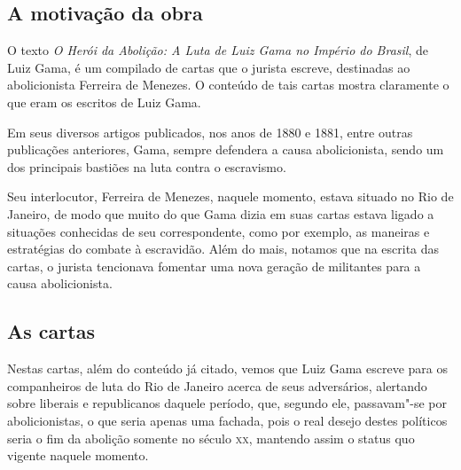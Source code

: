\documentclass[12pt]{extarticle}
\begin{document}


\subsection{A motivação da obra}

O texto \emph{O Herói da Abolição: A Luta de Luiz Gama no Império do
Brasil}, de Luiz Gama, é um compilado de cartas que o jurista escreve,
destinadas ao abolicionista Ferreira de Menezes. O conteúdo de tais
cartas mostra claramente o que eram os escritos de Luiz Gama.




Em seus diversos artigos publicados, nos anos de 1880 e 1881, entre
outras publicações anteriores, Gama, sempre defendera a causa
abolicionista, sendo um dos principais bastiões na luta contra o
escravismo.

Seu interlocutor, Ferreira de Menezes, naquele momento, estava situado
no Rio de Janeiro, de modo que muito do que Gama dizia em suas cartas
estava ligado a situações conhecidas de seu correspondente, como por
exemplo, as maneiras e estratégias do combate à escravidão. Além do
mais, notamos que na escrita das cartas, o jurista tencionava fomentar
uma nova geração de militantes para a causa abolicionista.

\subsection{As cartas}

Nestas cartas, além do conteúdo já citado, vemos que Luiz Gama escreve
para os companheiros de luta do Rio de Janeiro acerca de seus
adversários, alertando sobre liberais e republicanos daquele período,
que, segundo ele, passavam"-se por abolicionistas, o que seria apenas uma
fachada, pois o real desejo destes políticos seria o fim da abolição
somente no século \textsc{xx}, mantendo assim o status quo vigente naquele
momento.




\end{document}
